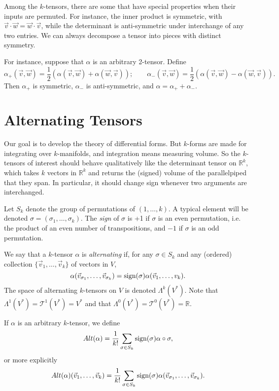 \documentclass[12pt]{amsbook}
\newcommand{\T}{{\mathcal T}}
\newcommand{\R}{{\mathbb R}}
\theoremstyle{definition}
\begin{document}
\smallskip

Among the $k$-tensors, there are some that have special properties
when their inputs are permuted. For instance, the inner product is
symmetric, with $\vec v \cdot \vec w = \vec w \cdot \vec v$, while the
determinant is anti-symmetric under interchange of any two entries. We
can always decompose a tensor into pieces with distinct symmetry.

For instance, suppose that $\alpha$ is an arbitrary 2-tensor. Define
$$ \alpha_+(\vec v, \vec w) = \frac12 \left ( \alpha(\vec v, \vec w) + \alpha(\vec w, \vec v) \right ); 
\qquad  \alpha_-(\vec v, \vec w) = \frac12 \left ( \alpha(\vec v, \vec w) - \alpha(\vec w, \vec v) \right ).$$
Then $\alpha_+$ is symmetric, $\alpha_-$ is anti-symmetric, and 
$\alpha = \alpha_+ + \alpha_-$. 

\section{Alternating Tensors}

Our goal is to develop the theory of differential forms. But $k$-forms are
made for integrating over $k$-manifolds, and integration means measuring volume.
So the $k$-tensors of interest should behave qualitatively like the determinant
tensor on $\R^k$, which takes $k$ vectors in $\R^k$ and returns the (signed)
volume of the parallelpiped that they span. In particular, it should 
change sign whenever two arguments are interchanged. 

Let $S_k$ denote the group of permutations of $(1,\ldots,k)$. A typical
element will be denoted $\sigma = (\sigma_1, \ldots, \sigma_k)$. The {\em sign}
of $\sigma$ is +1 if $\sigma$ is an even permutation, i.e. the product of 
an even number of transpositions, and $-1$ if $\sigma$ is an odd permutation. 

We say that a $k$-tensor $\alpha$ is {\em alternating} if, for any 
$\sigma \in S_k$ and any (ordered) collection $\{\vec v_1, \ldots, \vec v_k\}$ 
of vectors in $V$, 
$$ \alpha(\vec v_{\sigma_1},\ldots, \vec v_{\sigma_k}) = 
\hbox{sign}(\sigma) \alpha(\vec v_1, \ldots, v_k).$$
The space of alternating $k$-tensors on $V$ is denoted $\Lambda^k(V^*)$.
Note that $\Lambda^1(V^*)=\T^1(V^*)=V^*$ and that $\Lambda^0(V^*)=\T^0(V^*)=\R$.

If $\alpha$ is an arbitrary $k$-tensor, we define
$$ Alt(\alpha) = \frac{1}{k!} \sum_{\sigma \in S_k} \hbox{sign}(\sigma)
\alpha \circ \sigma,$$
or more explicitly
$$ Alt(\alpha)(\vec v_1, \ldots, \vec v_k) = \frac{1}{k!} \sum_{\sigma \in S_k}
\hbox{sign}(\sigma) \alpha(\vec v_{\sigma_1},\ldots, \vec v_{\sigma_k}).$$
\end{document}
